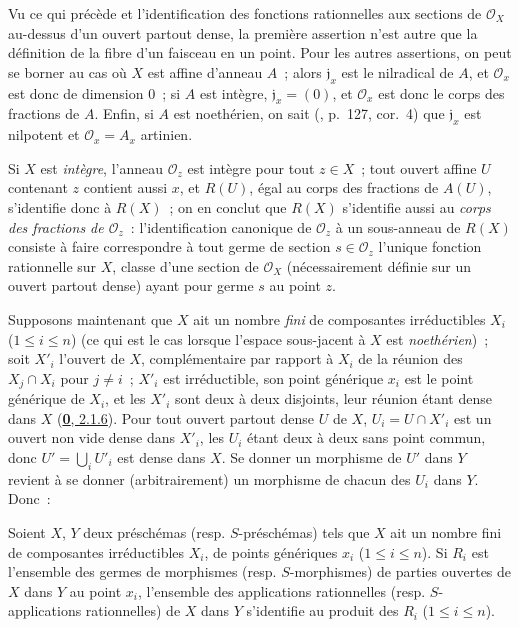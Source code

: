 Vu ce qui précède et l'identification des fonctions rationnelles aux sections
de $\mathscr{O}_X$ au-dessus d'un ouvert partout dense, la première assertion
n'est autre que la définition de la fibre d'un faisceau en un point. Pour les
autres assertions, on peut se borner au cas où $X$ est affine d'anneau $A$~;
alors $\mathfrak{j}_x$ est le nilradical de $A$, et $\mathscr{O}_x$ est donc de
dimension 0~; si $A$ est intègre, $\mathfrak{j}_x=(0)$, et $\mathscr{O}_x$ est
donc le corps des fractions de $A$. Enfin, si $A$ est noethérien, on sait
(\cite{I-11}, p.~127, cor.~4) que $\mathfrak{j}_x$ est nilpotent et
$\mathscr{O}_x=A_x$ artinien.

Si $X$ est \emph{intègre}, l'anneau $\mathscr{O}_z$ est intègre pour tout
$z\in X$~; tout ouvert affine $U$ contenant $z$ contient aussi $x$, et $R(U)$,
égal au corps des fractions de $A(U)$, s'identifie donc à $R(X)$~; on en
conclut que $R(X)$ s'identifie aussi au
\emph{corps des fractions de $\mathscr{O}_z$}~: l'identification canonique de
$\mathscr{O}_z$ à un sous-anneau de $R(X)$ consiste à faire correspondre à tout
germe de section $s\in\mathscr{O}_z$ l'unique fonction rationnelle sur $X$,
classe d'une section de $\mathscr{O}_X$ (nécessairement définie sur un ouvert
partout dense) ayant pour germe $s$ au point $z$.

\begin{env}[7.1.6]
\label{I.7.1.6-fr}
Supposons maintenant que $X$ ait un nombre \emph{fini} de composantes
irréductibles $X_i$ ($1\leq i\leq n$) (ce qui est le cas lorsque l'espace
sous-jacent à $X$ est \emph{noethérien})~; soit $X'_i$ l'ouvert de $X$,
complémentaire par rapport à $X_i$ de la réunion des $X_j\cap X_i$ pour
$j\neq i$~; $X'_i$ est irréductible, son point générique $x_i$ est le point
générique de $X_i$, et les $X'_i$ sont deux à deux disjoints, leur réunion
étant dense dans $X$ (\hyperref[0.2.1.6-fr]{\textbf{0}, 2.1.6}). Pour
tout ouvert partout dense $U$ de $X$, $U_i=U\cap X'_i$ est un ouvert non vide
dense dans $X'_i$, les $U_i$ étant deux à deux sans point commun, donc
$U'=\bigcup_i U'_i$ est dense dans $X$. Se donner un morphisme de $U'$ dans $Y$
revient à se donner (arbitrairement) un morphisme de chacun des $U_i$ dans $Y$.
Donc~:
\end{env}

\begin{proposition}[7.1.7]
\label{I.7.1.7-fr}
Soient $X$, $Y$ deux préschémas (\textup{resp.} $S$-préschémas) tels que $X$ ait un
nombre fini de composantes irréductibles $X_i$, de points génériques $x_i$
($1\leq i\leq n$). Si $R_i$ est l'ensemble des germes de morphismes (\textup{resp.}
$S$-morphismes) de parties ouvertes de $X$ dans $Y$ au point $x_i$, l'ensemble
des applications rationnelles (\textup{resp.} $S$-applications rationnelles) de $X$
dans $Y$ s'identifie au produit des $R_i$ ($1\leq i\leq n$).
\end{proposition}

